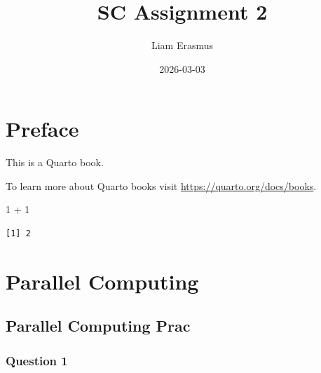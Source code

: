 \documentclass[
  letterpaper,
  DIV=11,
  numbers=noendperiod]{scrreprt}
\title{SC Assignment 2}
\author{Liam Erasmus}
\date{2026-03-03}
\newenvironment{Shaded}{\begin{snugshade}}{\end{snugshade}}
\newcommand{\DecValTok}[1]{\textcolor[rgb]{0.68,0.00,0.00}{#1}}
\newcommand{\SpecialCharTok}[1]{\textcolor[rgb]{0.37,0.37,0.37}{#1}}
\renewcommand*\contentsname{Table of contents}
\newcommand\contentsname{Table of contents}
\begin{document}
\maketitle

\renewcommand*\contentsname{Table of contents}
{
\hypersetup{linkcolor=}
\setcounter{tocdepth}{2}
\tableofcontents
}


\chapter*{Preface}\label{preface}


This is a Quarto book.

To learn more about Quarto books visit
\url{https://quarto.org/docs/books}.

\begin{Shaded}
\begin{Highlighting}[]
\DecValTok{1} \SpecialCharTok{+} \DecValTok{1}
\end{Highlighting}
\end{Shaded}

\begin{verbatim}
[1] 2
\end{verbatim}


\chapter{Parallel Computing}\label{parallel-computing}

\section{Parallel Computing Prac}\label{parallel-computing-prac}

\subsection{Question 1}\label{question-1}
\end{document}
